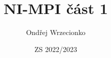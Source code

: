 \documentclass{article}
\title{NI-MPI část 1}
\author{Ondřej Wrzecionko}
\date{ZS 2022/2023}
\begin{document}
\maketitle

\renewcommand{\contentsname}{Obsah}
\tableofcontents





\end{document}
